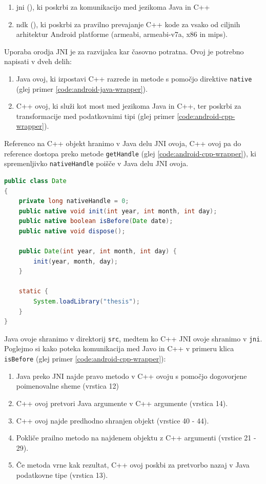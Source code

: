\begin{enumerate}
  \item \gls{jni} (), ki poskrbi za komunikacijo med jezikoma Java in C++
  \item \gls{ndk} (), ki poskrbi za pravilno prevajanje C++ kode za vsako od ciljnih arhitektur Android platforme (armeabi, armeabi-v7a, x86 in mips).
\end{enumerate}

Uporaba orodja JNI je za razvijalca kar časovno potratna. Ovoj je potrebno napisati v dveh delih:

\begin{enumerate}
  \item Java ovoj, ki izpostavi C++ razrede in metode s pomočjo direktive \texttt{native} (glej primer \ref{code:android-java-wrapper}).
  \item C++ ovoj, ki služi kot most med jezikoma Java in C++, ter poskrbi za transformacije med podatkovnimi tipi (glej primer \ref{code:android-cpp-wrapper}).
\end{enumerate}

Referenco na C++ objekt hranimo v Java delu JNI ovoja, C++ ovoj pa do reference dostopa preko metode \texttt{getHandle} (glej \ref{code:android-cpp-wrapper}), ki spremenljivko \texttt{nativeHandle} poišče v Java delu JNI ovoja.

\begin{lstlisting}[caption={Primer Java ovoja C++ razreda \texttt{Date}.}, label=code:android-java-wrapper, language=Java]
public class Date
{
	private long nativeHandle = 0;
	public native void init(int year, int month, int day);
	public native boolean isBefore(Date date);
	public native void dispose();

	public Date(int year, int month, int day) {
		init(year, month, day);
	}

	static {
		System.loadLibrary("thesis");
	}
}
\end{lstlisting}

Java ovoje shranimo v direktorij \texttt{src}, medtem ko C++ JNI ovoje shranimo v \texttt{jni}. Poglejmo si kako poteka komunikacija med Javo in C++ v primeru klica \texttt{isBefore} (glej primer \ref{code:android-cpp-wrapper}):

\begin{enumerate}
  \item Java preko JNI najde pravo metodo v C++ ovoju s pomočjo dogovorjene poimenovalne sheme (vrstica 12)
  \item C++ ovoj pretvori Java argumente v C++ argumente (vrstica 14).
  \item C++ ovoj najde predhodno shranjen objekt (vrstice 40 - 44).
  \item Pokliče prailno metodo na najdenem objektu z C++ argumenti (vrstice 21 - 29).
  \item Če metoda vrne kak rezultat, C++ ovoj poskbi za pretvorbo nazaj v Java podatkovne tipe (vrstica 13).
\end{enumerate}

